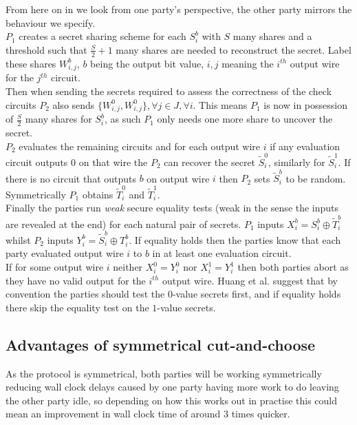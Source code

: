 \documentclass[ %
                    author={Nicholas Tutte},
                supervisor={Prof. Nigel Smart},
                    degree={MEng},
                     title={Secure Two Party Computation},
                  subtitle={A practical comparison of recent protocols},
                      type={Research - GG1K},
                      year={2015} ]{dissertation}
\begin{document}
				From here on in we look from one party's perspective, the other party mirrors the behaviour we specify.\\

				$P_1$ creates a secret sharing scheme for each $S_i^b$ with $S$ many shares and a threshold such that $\frac{S}{2} + 1$ many shares are needed to reconstruct the secret. Label these shares $W_{i, j}^b$, $b$ being the output bit value, $i, j$ meaning the $i^{th}$ output wire for the $j^{th}$ circuit.\\

				Then when sending the secrets required to assess the correctness of the check circuits $P_2$ also sends $\{W_{i, j}^0, W_{i, j}^0\}, \forall j \in J, \forall i$. This means $P_1$ is now in possession of $\frac{S}{2}$ many shares for $S_i^b$, as such $P_1$ only needs one more share to uncover the secret.\\

				$P_2$ evaluates the remaining circuits and for each output wire $i$ if any evaluation circuit outputs $0$ on that wire the $P_2$ can recover the secret $\tilde S_i^0$, similarly for $\tilde S_i^1$. If there is no circuit that outputs $b$ on output wire $i$ then $P_2$ sets $\tilde S_i^b$ to be random. Symmetrically $P_1$ obtains $\tilde T_i^0$ and $\tilde T_i^1$.\\

				Finally the parties run \emph{weak} secure equality tests (weak in the sense the inputs are revealed at the end) for each natural pair of secrets. $P_1$ inputs $X_i^b = S_i^b \oplus \tilde T_i^b$ whilst $P_2$ inputs $Y_i^b = \tilde S_i^b \oplus T_i^b$. If equality holds then the parties know that each party evaluated output wire $i$ to $b$ in at least one evaluation circuit.\\

				If for some output wire $i$ neither $X_i^0 = Y_i^0$ nor $X_i^1 = Y_i^1$ then both parties abort as they have no valid output for the $i^{th}$ output wire. Huang et al. suggest that by convention the parties should test the $0$-value secrets first, and if equality holds there skip the equality test on the $1$-value secrets.


			\subsection{Advantages of symmetrical cut-and-choose}
				As the protocol is symmetrical, both parties will be working symmetrically reducing wall clock delays caused by one party having more work to do leaving the other party idle, so depending on how this works out in practise this could mean an improvement in wall clock time of around $3$ times quicker.\\
\end{document}
